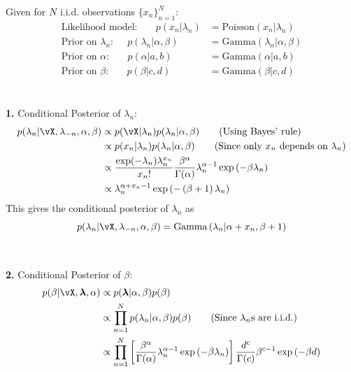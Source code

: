 \documentclass[a4paper,11pt]{article}
\begin{document}
\begin{pmisolution}
\noindent Given for $N$ i.i.d. observations $\{x_n\}_{n=1}^N$:
\begin{equation*}
    \begin{split}
        \text{Likelihood model: } ~~~~~~~ p(x_n | \lambda_n) &= \text{Poisson}(x_n | \lambda_n) \\
        \text{Prior on $\lambda_n$: } ~~~~~ p(\lambda_n | \alpha, \beta) &= \text{Gamma}(\lambda_n | \alpha, \beta) \\
        \text{Prior on $\alpha$: } ~~~~~~~ p(\alpha | a,b) &= \text{Gamma}(\alpha | a,b) \\
        \text{Prior on $\beta$: } ~~~~~~~ p(\beta | c,d) &= \text{Gamma}(\beta | c,d)
    \end{split}
\end{equation*}
\\ \\
\noindent \textbf{1. } Conditional Posterior of $\lambda_n$:
\begin{align*}
    p(\lambda_n | \vX, \lambda_{-n}, \alpha, \beta) &\propto p(\vX | \lambda_n) p(\lambda_n| \alpha, \beta) \tag{Using Bayes' rule}\\
    &\propto p(x_n | \lambda_n) p(\lambda_n| \alpha, \beta) \tag{Since only $x_n$ depends on $\lambda_n$}\\
    &\propto \frac{\exp(-\lambda_n)\lambda_n^{x_n}}{x_n!} \frac{\beta^{\alpha}}{\Gamma(\alpha)} \lambda_n^{\alpha-1} \exp{(-\beta \lambda_n)}\\
    &\propto \lambda_n^{\alpha + x_n -1} \exp \left(-\left(\beta+1\right) \lambda_n\right)
\end{align*}
This gives the conditional posterior of $\lambda_n$ as
\begin{equation*}
p(\lambda_n | \vX, \lambda_{-n}, \alpha, \beta) = \text{Gamma}\left(\lambda_n \middle| \alpha + x_n, \beta+1 \right)
\end{equation*}
\\ \\
\noindent \textbf{2. } Conditional Posterior of $\beta$:
\begin{align*}
    p(\beta |  \vX, \boldsymbol{\lambda}, \alpha) &\propto p(\boldsymbol{\lambda} | \alpha, \beta) p(\beta)\\
    &\propto \prod_{n=1}^N p(\lambda_n | \alpha, \beta) p(\beta) \tag{Since $\lambda_n$s are i.i.d.}\\
    &\propto \prod_{n=1}^N \left[ \frac{\beta^{\alpha}}{\Gamma(\alpha)} \lambda_n^{\alpha-1} \exp{(-\beta \lambda_n)} \right] \frac{d^{c}}{\Gamma(c)} \beta^{c-1} \exp{(-\beta d)}\\

\end{align*}
\end{pmisolution}
\end{document}
